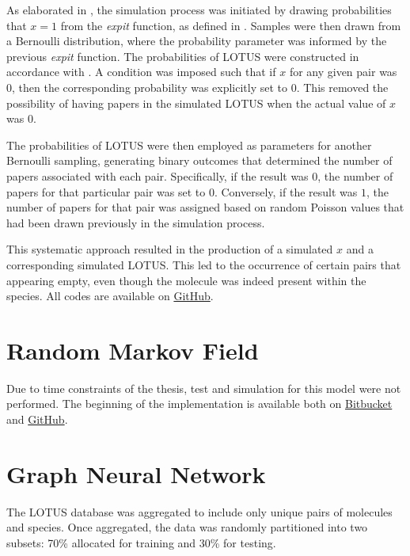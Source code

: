 \documentclass[
11pt, %
oneside, %
english, %
singlespacing, %
headsepline, %
chapterinoneline, %
]{MastersDoctoralThesis} %
\begin{document}
As elaborated in , the simulation process was initiated by drawing probabilities that $x=1$ from the \textit{expit} function, as defined in . 
Samples were then drawn from a Bernoulli distribution, where the probability parameter was informed by the previous \textit{expit} function. The probabilities of LOTUS were constructed in accordance with . A condition was imposed such that if $x$ for any given pair was $0$, then the corresponding probability was explicitly set to $0$. This removed the possibility of having papers in the simulated LOTUS when the actual value of $x$ was $0$.

The probabilities of LOTUS were then employed as parameters for another Bernoulli sampling, generating binary outcomes that determined the number of papers associated with each pair. Specifically, if the result was $0$, the number of papers for that particular pair was set to $0$. Conversely, if the result was $1$, the number of papers for that pair was assigned based on random Poisson values that had been drawn previously in the simulation process.

This systematic approach resulted in the production of a simulated $x$ and a corresponding simulated LOTUS. This led to the occurrence of certain pairs that appearing empty, even though the molecule was indeed present within the species. All codes are available on \href{https://github.com/commons-research/anticipated-lotus}{GitHub}.
 
\section{Random Markov Field}
Due to time constraints of the thesis, test and simulation for this model were not performed. The beginning of the implementation is available both on \href{https://bitbucket.org/wegmannlab/metabolite_inference/src/master/}{Bitbucket} and \href{https://github.com/anticipated-lotus/metabolite_inference}{GitHub}.

\section{Graph Neural Network}\label{sec:methods:GNN}
The LOTUS database was aggregated to include only unique pairs of molecules and species. Once aggregated, the data was randomly partitioned into two subsets: 70\% allocated for training and 30\% for testing.
\end{document}
